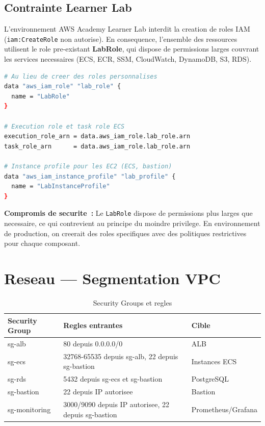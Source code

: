 \subsection{Contrainte Learner Lab}

L'environnement AWS Academy Learner Lab interdit la creation de roles IAM
(\texttt{iam:CreateRole} non autorise). En consequence, l'ensemble des
ressources utilisent le role pre-existant \textbf{LabRole}, qui dispose
de permissions larges couvrant les services necessaires (ECS, ECR, SSM,
CloudWatch, DynamoDB, S3, RDS).

\begin{lstlisting}[language=bash,caption={Utilisation du LabRole dans Terraform}]
# Au lieu de creer des roles personnalises
data "aws_iam_role" "lab_role" {
  name = "LabRole"
}

# Execution role et task role ECS
execution_role_arn = data.aws_iam_role.lab_role.arn
task_role_arn      = data.aws_iam_role.lab_role.arn

# Instance profile pour les EC2 (ECS, bastion)
data "aws_iam_instance_profile" "lab_profile" {
  name = "LabInstanceProfile"
}
\end{lstlisting}

\textbf{Compromis de securite~:} Le \texttt{LabRole} dispose de permissions
plus larges que necessaire, ce qui contrevient au principe du moindre privilege.
En environnement de production, on creerait des roles specifiques avec des
politiques restrictives pour chaque composant.

\section{Reseau --- Segmentation VPC}

\begin{table}[H]
    \centering
    \begin{tabularx}{\textwidth}{lXl}
        \toprule
        \textbf{Security Group} & \textbf{Regles entrantes} & \textbf{Cible} \\
        \midrule
        sg-alb & 80 depuis 0.0.0.0/0 & ALB \\
        sg-ecs & 32768-65535 depuis sg-alb, 22 depuis sg-bastion & Instances ECS \\
        sg-rds & 5432 depuis sg-ecs et sg-bastion & PostgreSQL \\
        sg-bastion & 22 depuis IP autorisee & Bastion \\
        sg-monitoring & 3000/9090 depuis IP autorisee, 22 depuis sg-bastion & Prometheus/Grafana \\
        \bottomrule
    \end{tabularx}
    \caption{Security Groups et regles}
\end{table}

